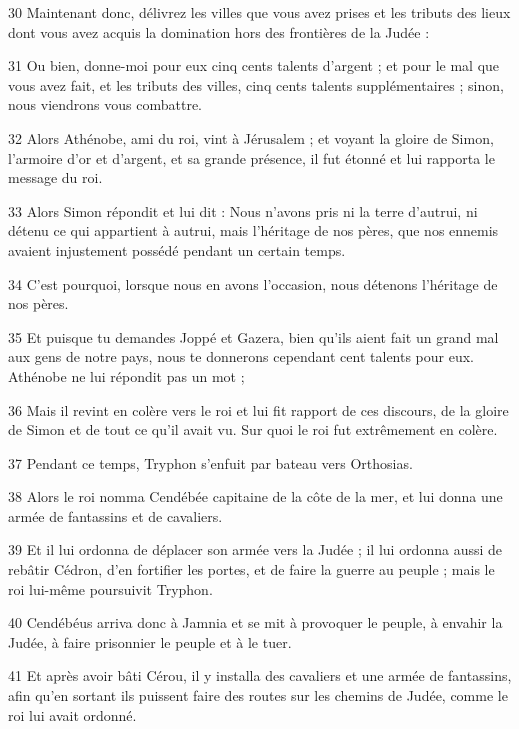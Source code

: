 \par 30 Maintenant donc, délivrez les villes que vous avez prises et les tributs des lieux dont vous avez acquis la domination hors des frontières de la Judée :
\par 31 Ou bien, donne-moi pour eux cinq cents talents d'argent ; et pour le mal que vous avez fait, et les tributs des villes, cinq cents talents supplémentaires ; sinon, nous viendrons vous combattre.
\par 32 Alors Athénobe, ami du roi, vint à Jérusalem ; et voyant la gloire de Simon, l'armoire d'or et d'argent, et sa grande présence, il fut étonné et lui rapporta le message du roi.
\par 33 Alors Simon répondit et lui dit : Nous n'avons pris ni la terre d'autrui, ni détenu ce qui appartient à autrui, mais l'héritage de nos pères, que nos ennemis avaient injustement possédé pendant un certain temps.
\par 34 C'est pourquoi, lorsque nous en avons l'occasion, nous détenons l'héritage de nos pères.
\par 35 Et puisque tu demandes Joppé et Gazera, bien qu'ils aient fait un grand mal aux gens de notre pays, nous te donnerons cependant cent talents pour eux. Athénobe ne lui répondit pas un mot ;
\par 36 Mais il revint en colère vers le roi et lui fit rapport de ces discours, de la gloire de Simon et de tout ce qu'il avait vu. Sur quoi le roi fut extrêmement en colère.
\par 37 Pendant ce temps, Tryphon s'enfuit par bateau vers Orthosias.
\par 38 Alors le roi nomma Cendébée capitaine de la côte de la mer, et lui donna une armée de fantassins et de cavaliers.
\par 39 Et il lui ordonna de déplacer son armée vers la Judée ; il lui ordonna aussi de rebâtir Cédron, d'en fortifier les portes, et de faire la guerre au peuple ; mais le roi lui-même poursuivit Tryphon.
\par 40 Cendébéus arriva donc à Jamnia et se mit à provoquer le peuple, à envahir la Judée, à faire prisonnier le peuple et à le tuer.
\par 41 Et après avoir bâti Cérou, il y installa des cavaliers et une armée de fantassins, afin qu'en sortant ils puissent faire des routes sur les chemins de Judée, comme le roi lui avait ordonné.



